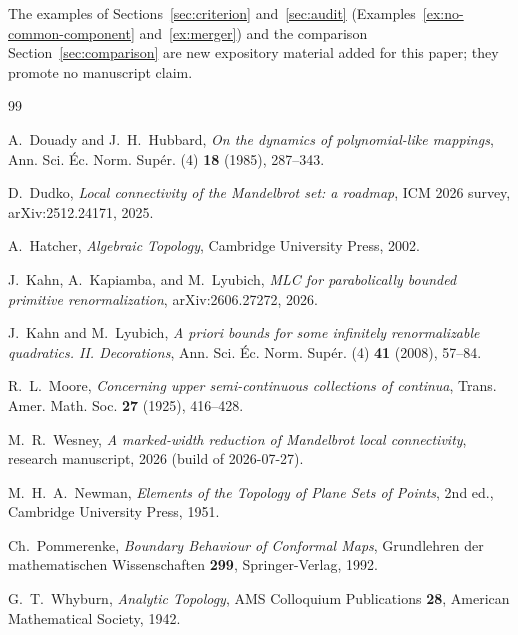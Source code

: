 \documentclass[11pt,reqno]{amsart}
\theoremstyle{definition}
\theoremstyle{remark}
\begin{document}
The examples of Sections~\ref{sec:criterion} and~\ref{sec:audit}
(Examples~\ref{ex:no-common-component} and~\ref{ex:merger}) and the
comparison Section~\ref{sec:comparison} are new expository material added for
this paper; they promote no manuscript claim.

\begin{thebibliography}{99}

A.~Douady and J.~H.~Hubbard,
\emph{On the dynamics of polynomial-like mappings},
Ann. Sci. \'Ec. Norm. Sup\'er. (4) \textbf{18} (1985), 287--343.

D.~Dudko,
\emph{Local connectivity of the Mandelbrot set: a roadmap},
ICM 2026 survey, arXiv:2512.24171, 2025.

A.~Hatcher,
\emph{Algebraic Topology},
Cambridge University Press, 2002.

J.~Kahn, A.~Kapiamba, and M.~Lyubich,
\emph{MLC for parabolically bounded primitive renormalization},
arXiv:2606.27272, 2026.

J.~Kahn and M.~Lyubich,
\emph{A priori bounds for some infinitely renormalizable quadratics. II. Decorations},
Ann. Sci. \'Ec. Norm. Sup\'er. (4) \textbf{41} (2008), 57--84.

R.~L.~Moore,
\emph{Concerning upper semi-continuous collections of continua},
Trans. Amer. Math. Soc. \textbf{27} (1925), 416--428.

M.~R.~Wesney,
\emph{A marked-width reduction of Mandelbrot local connectivity},
research manuscript, 2026 (build of 2026-07-27).

M.~H.~A.~Newman,
\emph{Elements of the Topology of Plane Sets of Points},
2nd ed., Cambridge University Press, 1951.

Ch.~Pommerenke,
\emph{Boundary Behaviour of Conformal Maps},
Grundlehren der mathematischen Wissenschaften \textbf{299},
Springer-Verlag, 1992.

G.~T.~Whyburn,
\emph{Analytic Topology},
AMS Colloquium Publications \textbf{28},
American Mathematical Society, 1942.

\end{thebibliography}
\end{document}
